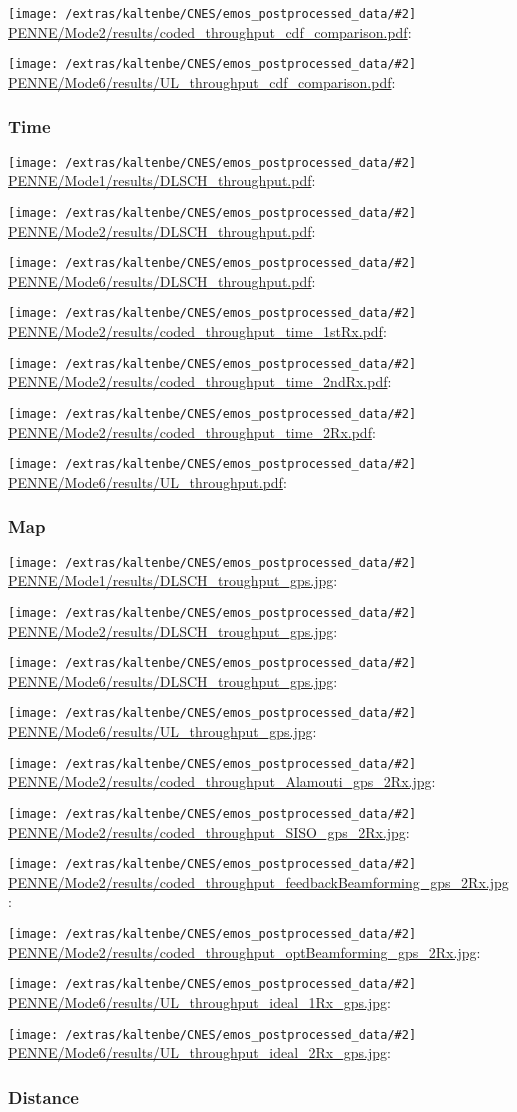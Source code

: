 \documentclass[a4paper,10pt]{article}
\newcommand{\printfile}[2][]{
 \begin{minipage}{8cm}
  \centering
  \texttt{[image: /extras/kaltenbe/CNES/emos\_postprocessed\_data/\#2]}
  \url{#2}: #1

 \end{minipage}
}
\begin{document}



\printfile{PENNE/Mode2/results/coded_throughput_cdf_comparison.pdf}
\printfile{PENNE/Mode6/results/UL_throughput_cdf_comparison.pdf}

\subsubsection{Time}

\printfile{PENNE/Mode1/results/DLSCH_throughput.pdf}
\printfile{PENNE/Mode2/results/DLSCH_throughput.pdf}

\printfile{PENNE/Mode6/results/DLSCH_throughput.pdf}
\printfile{PENNE/Mode2/results/coded_throughput_time_1stRx.pdf}

\printfile{PENNE/Mode2/results/coded_throughput_time_2ndRx.pdf}
\printfile{PENNE/Mode2/results/coded_throughput_time_2Rx.pdf}

\printfile{PENNE/Mode6/results/UL_throughput.pdf}


\subsubsection{Map}

\printfile{PENNE/Mode1/results/DLSCH_troughput_gps.jpg}
\printfile{PENNE/Mode2/results/DLSCH_troughput_gps.jpg}

\printfile{PENNE/Mode6/results/DLSCH_troughput_gps.jpg}
\printfile{PENNE/Mode6/results/UL_throughput_gps.jpg}

\printfile{PENNE/Mode2/results/coded_throughput_Alamouti_gps_2Rx.jpg}
\printfile{PENNE/Mode2/results/coded_throughput_SISO_gps_2Rx.jpg}

\printfile{PENNE/Mode2/results/coded_throughput_feedbackBeamforming_gps_2Rx.jpg}
\printfile{PENNE/Mode2/results/coded_throughput_optBeamforming_gps_2Rx.jpg}

\printfile{PENNE/Mode6/results/UL_throughput_ideal_1Rx_gps.jpg}
\printfile{PENNE/Mode6/results/UL_throughput_ideal_2Rx_gps.jpg}

\subsubsection{Distance}
\end{document}
